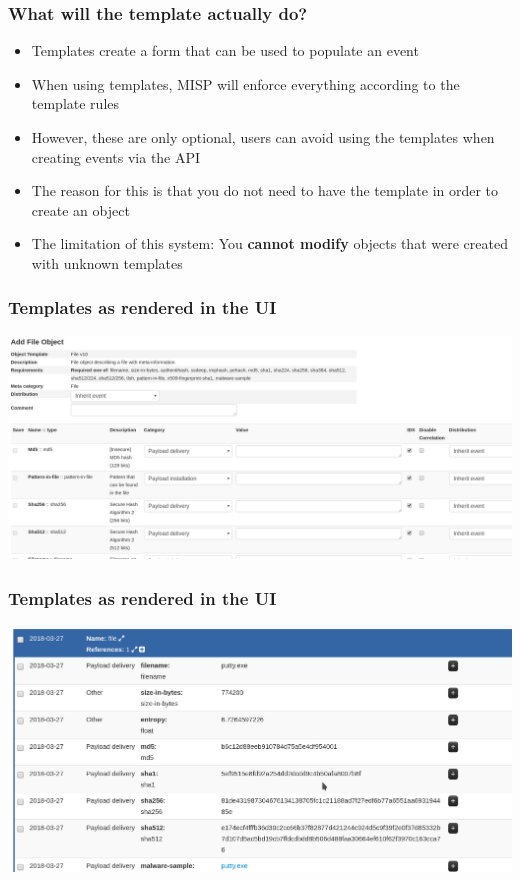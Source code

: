 \begin{frame}
\frametitle{What will the template actually do?}
\begin{itemize}
\item Templates create a form that can be used to populate an event
\item When using templates, MISP will enforce everything according to the template rules
\item However, these are only optional, users can avoid using the templates when creating events via the API
\item The reason for this is that you do not need to have the template in order to create an object
\item The limitation of this system: You {\bf cannot modify} objects that were created with unknown templates
\end{itemize}
\end{frame}

\begin{frame}
\frametitle{Templates as rendered in the UI}
\includegraphics[scale=0.4]{template.png}
\end{frame}

\begin{frame}
\frametitle{Templates as rendered in the UI}
\includegraphics[scale=0.21]{object.png}
\end{frame}

